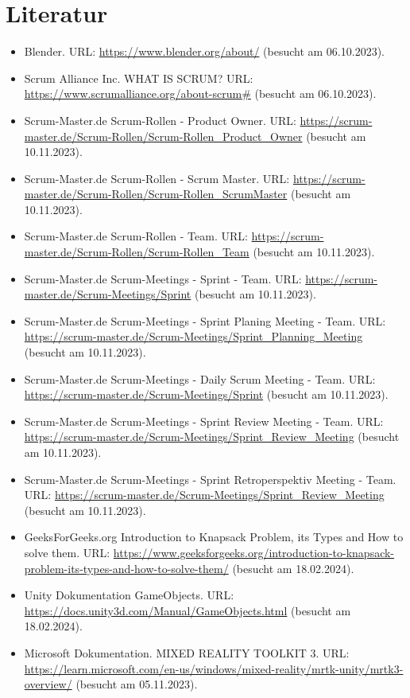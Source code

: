 \chapter{Literatur}

\begin{itemize}
    \item Blender. URL: \url{https://www.blender.org/about/} (besucht am 06.10.2023).
    \item Scrum Alliance Inc. WHAT IS SCRUM? URL: \url{https://www.scrumalliance.org/about-scrum#} (besucht am 06.10.2023).
    \item Scrum-Master.de Scrum-Rollen - Product Owner. URL: \url{https://scrum-master.de/Scrum-Rollen/Scrum-Rollen_Product_Owner} (besucht am 10.11.2023).
    \item Scrum-Master.de Scrum-Rollen - Scrum Master. URL: \url{https://scrum-master.de/Scrum-Rollen/Scrum-Rollen_ScrumMaster} (besucht am 10.11.2023).
    \item Scrum-Master.de Scrum-Rollen - Team. URL: \url{https://scrum-master.de/Scrum-Rollen/Scrum-Rollen_Team} (besucht am 10.11.2023).
    \item Scrum-Master.de Scrum-Meetings - Sprint - Team. URL: \url{https://scrum-master.de/Scrum-Meetings/Sprint} (besucht am 10.11.2023).
    \item Scrum-Master.de Scrum-Meetings - Sprint Planing Meeting - Team. URL: \url{https://scrum-master.de/Scrum-Meetings/Sprint_Planning_Meeting} (besucht am 10.11.2023).
    \item Scrum-Master.de Scrum-Meetings - Daily Scrum Meeting - Team. URL: \url{https://scrum-master.de/Scrum-Meetings/Sprint} (besucht am 10.11.2023).
    \item Scrum-Master.de Scrum-Meetings - Sprint Review Meeting - Team. URL: \url{https://scrum-master.de/Scrum-Meetings/Sprint_Review_Meeting} (besucht am 10.11.2023).
    \item Scrum-Master.de Scrum-Meetings - Sprint Retroperspektiv Meeting - Team. URL: \url{https://scrum-master.de/Scrum-Meetings/Sprint_Review_Meeting} (besucht am 10.11.2023).
    \item GeeksForGeeks.org Introduction to Knapsack Problem, its Types and How to solve them. URL: \url{https://www.geeksforgeeks.org/introduction-to-knapsack-problem-its-types-and-how-to-solve-them/} (besucht am 18.02.2024).
    \item Unity Dokumentation GameObjects. URL: \url{https://docs.unity3d.com/Manual/GameObjects.html} (besucht am 18.02.2024).
    \item Microsoft Dokumentation. MIXED REALITY TOOLKIT 3. URL: \url{https://learn.microsoft.com/en-us/windows/mixed-reality/mrtk-unity/mrtk3-overview/} (besucht am 05.11.2023).

\end{itemize}
